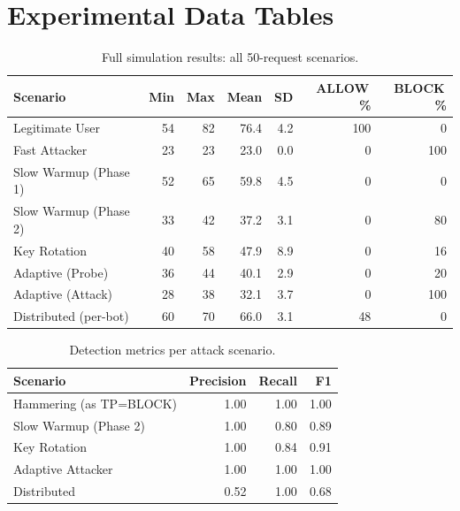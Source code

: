 \documentclass[10pt,conference]{IEEEtran}
\begin{document}
\section{Experimental Data Tables}
\label{app:data}

\begin{table}[h]
  \centering
  \caption{Full simulation results: all 50-request scenarios.}
  \label{tab:fulldata}
  \footnotesize
  \begin{tabular}{@{}lrrrrrr@{}}
    \toprule
    \textbf{Scenario} & \textbf{Min} & \textbf{Max}
      & \textbf{Mean} & \textbf{SD}
      & \textbf{ALLOW\,\%} & \textbf{BLOCK\,\%} \\
    \midrule
    Legitimate User          & 54 & 82 & 76.4 & 4.2  & 100 & 0  \\
    Fast Attacker            & 23 & 23 & 23.0 & 0.0  & 0   & 100 \\
    Slow Warmup (Phase 1)    & 52 & 65 & 59.8 & 4.5  & 0   & 0  \\
    Slow Warmup (Phase 2)    & 33 & 42 & 37.2 & 3.1  & 0   & 80 \\
    Key Rotation             & 40 & 58 & 47.9 & 8.9  & 0   & 16 \\
    Adaptive (Probe)         & 36 & 44 & 40.1 & 2.9  & 0   & 20 \\
    Adaptive (Attack)        & 28 & 38 & 32.1 & 3.7  & 0   & 100 \\
    Distributed (per-bot)    & 60 & 70 & 66.0 & 3.1  & 48  & 0  \\
    \bottomrule
  \end{tabular}
\end{table}

\begin{table}[h]
  \centering
  \caption{Detection metrics per attack scenario.}
  \label{tab:detection}
  \footnotesize
  \begin{tabular}{@{}lrrr@{}}
    \toprule
    \textbf{Scenario} & \textbf{Precision} & \textbf{Recall} & \textbf{F1} \\
    \midrule
    Hammering (as TP=BLOCK)  & 1.00 & 1.00 & 1.00 \\
    Slow Warmup (Phase 2)    & 1.00 & 0.80 & 0.89 \\
    Key Rotation             & 1.00 & 0.84 & 0.91 \\
    Adaptive Attacker        & 1.00 & 1.00 & 1.00 \\
    Distributed              & 0.52 & 1.00 & 0.68 \\
    \bottomrule
  \end{tabular}
\end{table}
\end{document}
